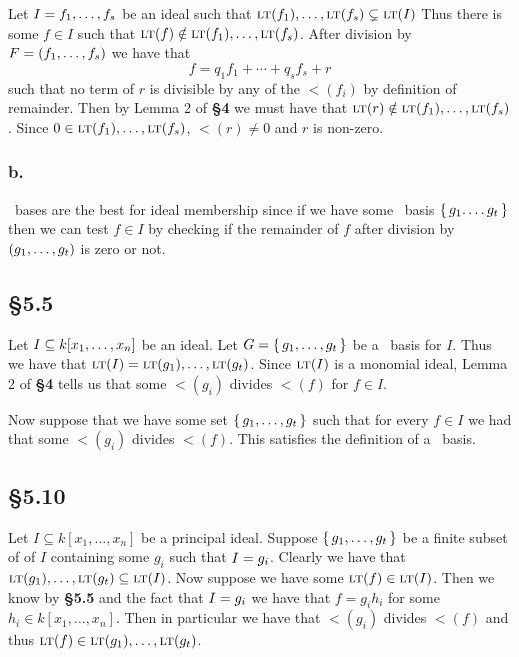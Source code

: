 \documentclass[letterpaper]{article}
\begin{document}
Let $I = \gen{f_{1}, \ldots, f_{s}}$ be an ideal such that $\gen{\lt(f_{1}), \ldots, \lt(f_{s})} \subsetneq \gen{\lt(I)}$ Thus there is some $f \in I$ such that $\lt(f) \notin \gen{\lt(f_{1}), \ldots, \lt(f_{s})}$.
After division by $F = \pqty{f_{1}, \ldots, f_{s}}$ we have that
\[
  f = q_{1}f_{1} + \cdots + q_{s}f_{s} + r
\]
such that no term of $r$ is divisible by any of the $\lt(f_{i})$ by definition of remainder.
Then by Lemma 2 of \textbf{\S 4} we must have that $\lt(r) \notin \gen{\lt(f_{1}), \ldots, \lt(f_{s})}$.
Since $0 \in \gen{\lt(f_{1}), \ldots, \lt(f_{s})}$, $\lt(r) \neq 0$ and $r$ is non-zero.

\subsubsection*{b.}

\Grobner\ bases are the best for ideal membership since if we have some \Grobner\ basis $\set{g_{1}.
\ldots g_{t}}$ then we can test $f \in I$ by checking if the remainder of $f$ after division by $\pqty{g_{1}, \ldots, g_{t}}$ is zero or not.

\clearpage

\subsection*{\S 5.5}

Let $I \subseteq k\bqty{x_{1}, \ldots, x_{n}}$ be an ideal.
Let $G = \set{g_{1}, \ldots, g_{t}}$ be a \Grobner\ basis for $I$.
Thus we have that $\gen{\lt(I)} = \gen{\lt(g_{1}), \ldots, \lt(g_{t})}$.
Since $\gen{\lt(I)}$ is a monomial ideal, Lemma 2 of \textbf{\S 4} tells us that some $\lt(g_{i})$ divides $\lt(f)$ for $f \in I$.

Now suppose that we have some set $\set{g_{1}, \ldots, g_{t}}$ such that for every $f \in I$ we had that some $\lt(g_{i})$ divides $\lt(f)$.
This satisfies the definition of a \Grobner\ basis.

\subsection*{\S 5.10}

Let $I \subseteq k[x_{1}, \ldots, x_{n}]$ be a principal ideal.
Suppose $\set{g_{1}, \ldots, g_{t}}$ be a finite subset of of $I$ containing some $g_{i}$ such that $I = \gen{g_{i}}$.
Clearly we have that $\gen{\lt(g_{1}), \ldots, \lt(g_{t})} \subseteq \gen{\lt(I)}$.
Now suppose we have some $\lt(f) \in \gen{\lt(I)}$.
Then we know by \textbf{\S 5.5} and the fact that $I = \gen{g_{i}}$ we have that $f = g_{i} h_{i}$ for some $h_{i} \in k[x_{1}, \ldots, x_{n}]$.
Then in particular we have that $\lt(g_{i})$ divides $\lt(f)$ and thus $\lt(f) \in \gen{\lt(g_{1}), \ldots, \lt(g_{t})}$.
\end{document}
